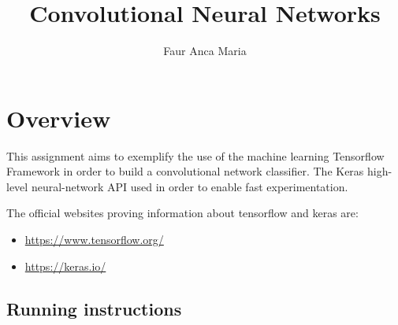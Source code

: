 \documentclass[a4paper,10pt]{article}
\title{Convolutional Neural Networks}
\author{Faur Anca Maria}
\begin{document}
\maketitle



\tableofcontents
\section{Overview}


\quad This assignment aims to exemplify the use of the machine learning Tensorflow Framework in order to build a convolutional network classifier. The Keras high-level neural-network API used in order to enable fast experimentation.     

\vspace{5mm} %

The official websites proving information about tensorflow and keras are:
\begin{itemize}
\item \url{https://www.tensorflow.org/}
\item \url{https://keras.io/}
\end{itemize}

\subsection{Running instructions}
\end{document}

